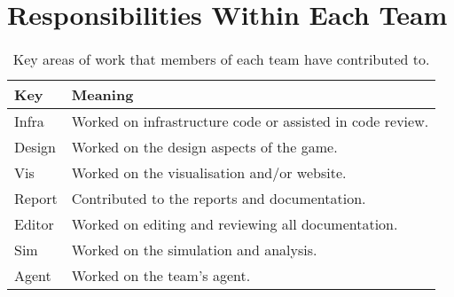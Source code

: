 \section{Responsibilities Within Each Team}
\label{sec:roles_appendix:individual}

\begin{table}[!h]
    \centering
    \begin{tabular}{|l|l|}
    \hline
    \textbf{Key}    & \textbf{Meaning}                                     \\ \hline
    Infra  & Worked on infrastructure code or assisted in code review.     \\
    Design & Worked on the design aspects of the game.                     \\
    Vis    & Worked on the visualisation and/or website.                   \\
    Report & Contributed to the reports and documentation.                 \\
    Editor & Worked on editing and reviewing all documentation.            \\
    Sim    & Worked on the simulation and analysis.                        \\
    Agent  & Worked on the team's agent.                                 \\ \hline
    \end{tabular}
    \caption{Key areas of work that members of each team have contributed to.}
    \label{table:roles_appendix:ind}
    \end{table}







